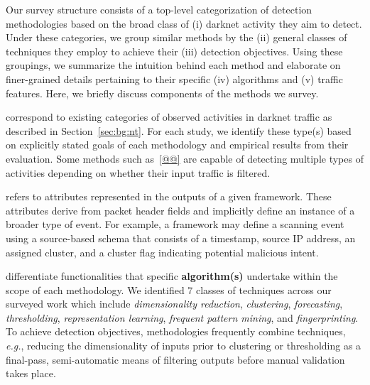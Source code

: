 \documentclass[manuscript,nonacm]{acmart}
\begin{document}
Our survey structure consists of a top-level categorization of detection methodologies based on the broad class of (i) darknet activity they aim to detect.
Under these categories, we group similar methods by the (ii) general classes of techniques they employ to achieve their (iii) detection objectives.
Using these groupings, we summarize the intuition behind each method and elaborate on finer-grained details pertaining to their specific (iv) algorithms and (v) traffic features.
Here, we briefly discuss components of the methods we survey.



\vspace{0.25em}
 correspond to existing categories of observed activities in darknet traffic as described in Section~\ref{sec:bg:nt}. 
For each study, we identify these type(s) based on explicitly stated goals of each methodology and empirical results from their evaluation. 
Some methods such as~\ref{@@} are capable of detecting multiple types of activities depending on whether their input traffic is filtered.

\vspace{0.25em}
 refers to attributes represented in the outputs of a given framework.
These attributes derive from packet header fields and implicitly define an instance of a broader type of event.
For example, a framework may define a scanning event using a source-based schema that consists of a timestamp, source IP address, an assigned cluster, and a cluster flag indicating potential malicious intent.

\vspace{0.25em}
 differentiate functionalities that specific \textbf{algorithm(s)} undertake within the scope of each methodology.
We identified 7 classes of techniques across our surveyed work which include \textit{dimensionality reduction}, \textit{clustering}, \textit{forecasting}, \textit{thresholding}, \textit{representation learning},
\textit{frequent pattern mining}, and \textit{fingerprinting}. 
To achieve detection objectives, methodologies frequently combine techniques, \textit{e.g.}, reducing the dimensionality of inputs prior to clustering or 
thresholding as a final-pass, semi-automatic means of filtering outputs before manual validation takes place.
\end{document}
